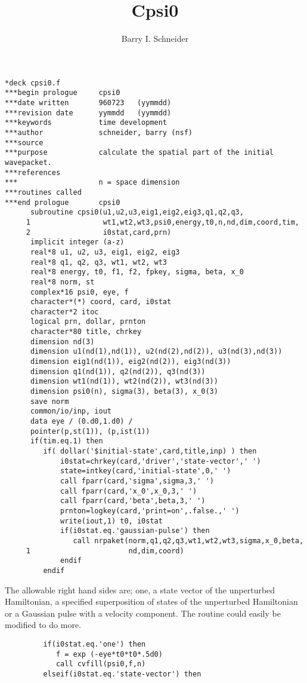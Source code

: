 \documentclass{article}
\title{Cpsi0}
\author{Barry I. Schneider}
\date{}
\begin{document}
 \maketitle
\begin{verbatim}
*deck cpsi0.f
***begin prologue     cpsi0
***date written       960723   (yymmdd)
***revision date      yymmdd   (yymmdd)
***keywords           time development
***author             schneider, barry (nsf)
***source             
***purpose            calculate the spatial part of the initial wavepacket.
***references         
***                   n = space dimension  
***routines called    
***end prologue       cpsi0
      subroutine cpsi0(u1,u2,u3,eig1,eig2,eig3,q1,q2,q3,
     1                 wt1,wt2,wt3,psi0,energy,t0,n,nd,dim,coord,tim,
     2                 i0stat,card,prn)
      implicit integer (a-z)
      real*8 u1, u2, u3, eig1, eig2, eig3
      real*8 q1, q2, q3, wt1, wt2, wt3
      real*8 energy, t0, f1, f2, fpkey, sigma, beta, x_0 
      real*8 norm, st
      complex*16 psi0, eye, f
      character*(*) coord, card, i0stat
      character*2 itoc
      logical prn, dollar, prnton
      character*80 title, chrkey
      dimension nd(3)
      dimension u1(nd(1),nd(1)), u2(nd(2),nd(2)), u3(nd(3),nd(3))
      dimension eig1(nd(1)), eig2(nd(2)), eig3(nd(3))
      dimension q1(nd(1)), q2(nd(2)), q3(nd(3))
      dimension wt1(nd(1)), wt2(nd(2)), wt3(nd(3))
      dimension psi0(n), sigma(3), beta(3), x_0(3)
      save norm
      common/io/inp, iout
      data eye / (0.d0,1.d0) /
      pointer(p,st(1)), (p,ist(1))
      if(tim.eq.1) then
         if( dollar('$initial-state',card,title,inp) ) then  
             i0stat=chrkey(card,'driver','state-vector',' ')
             state=intkey(card,'initial-state',0,' ')
             call fparr(card,'sigma',sigma,3,' ')  
             call fparr(card,'x_0',x_0,3,' ')
             call fparr(card,'beta',beta,3,' ')  
             prnton=logkey(card,'print=on',.false.,' ')
             write(iout,1) t0, i0stat
             if(i0stat.eq.'gaussian-pulse') then
                call nrpaket(norm,q1,q2,q3,wt1,wt2,wt3,sigma,x_0,beta,
     1                       nd,dim,coord)
             endif
         endif  
\end{verbatim}
        The allowable right hand sides are; one, a state vector of the
        unperturbed Hamiltonian, a specified superposition of states
        of the unperturbed Hamiltonian or a Gaussian pulse with a velocity
        component.  The routine could easily be modified to do more.
\begin{verbatim}
         if(i0stat.eq.'one') then
            f = exp (-eye*t0*t0*.5d0)
            call cvfill(psi0,f,n)
         elseif(i0stat.eq.'state-vector') then
\end{verbatim}
\end{document}
